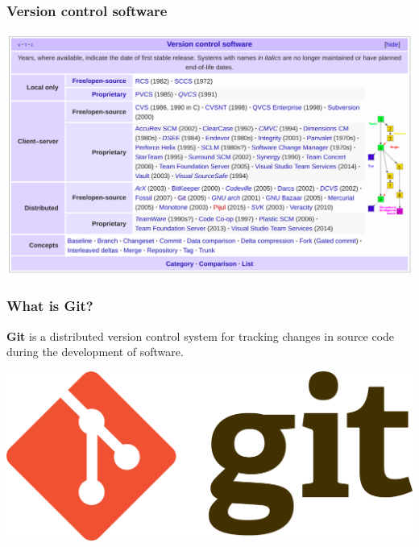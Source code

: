 \documentclass{beamer}
\begin{document}
\begin{frame}
\frametitle{Version control software}
\begin{center}
\includegraphics[scale=0.29]{img/controlVersion.png}
\end{center}
\end{frame}


\begin{frame}
\frametitle{What is Git?}

\textbf{Git} is a distributed version control system for tracking changes in source code during the development of software.

 \hfill \break

\begin{center}
\includegraphics[scale=0.07]{img/git_logo.png}
\end{center}
\end{frame}
\end{document}
